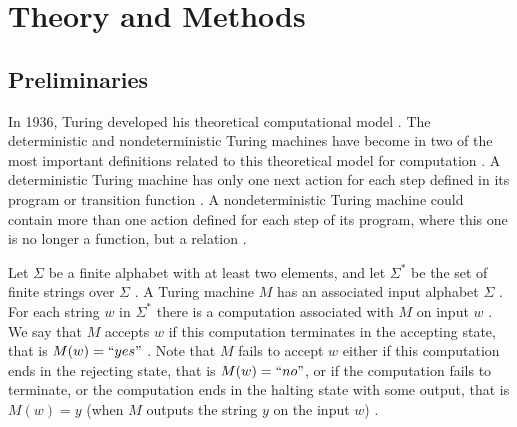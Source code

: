 \documentclass[a4paper,UKenglish,cleveref, autoref]{lipics-v2019}
\begin{document}
\section{Theory and Methods}

\subsection{Preliminaries}

In 1936, Turing developed his theoretical computational model \cite{MS06}. The deterministic and nondeterministic Turing machines have become in two of the most important definitions related to this theoretical model for computation \cite{MS06}. A deterministic Turing machine has only one next action for each step defined in its program or transition function \cite{MS06}. A nondeterministic Turing machine could contain more than one action defined for each step of its program, where this one is no longer a function, but a relation \cite{MS06}.

Let $\Sigma$ be a finite alphabet with at least two elements, and let $\Sigma^{*}$ be the set of finite strings over $\Sigma$ \cite{AB09}. A Turing machine $M$ has an associated input alphabet $\Sigma$ \cite{AB09}. For each string $w$ in $\Sigma^{*}$ there is a computation associated with $M$ on input $w$ \cite{AB09}. We say that $M$ accepts $w$ if this computation terminates in the accepting state, that is $M(w)=``yes"$ \cite{AB09}. Note that $M$ fails to accept $w$ either if this computation ends in the rejecting state, that is $M(w)=``no"$, or if the computation fails to terminate, or the computation ends in the halting state with some output, that is $M(w)=y$ (when $M$ outputs the string $y$ on the input $w$) \cite{AB09}.
\end{document}
